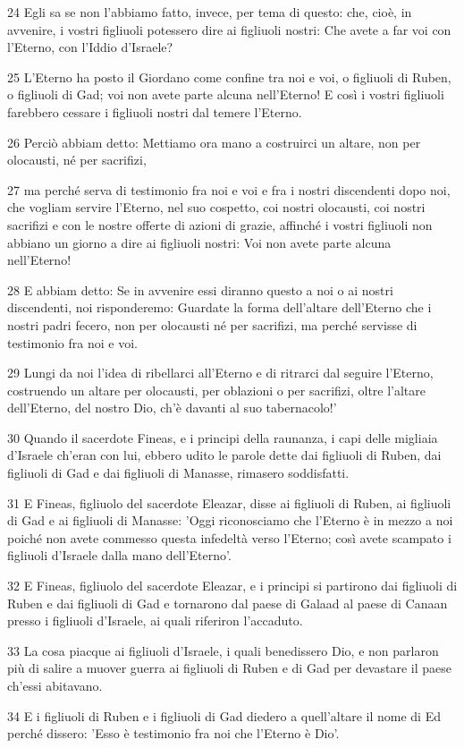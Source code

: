 \par 24 Egli sa se non l'abbiamo fatto, invece, per tema di questo: che, cioè, in avvenire, i vostri figliuoli potessero dire ai figliuoli nostri: Che avete a far voi con l'Eterno, con l'Iddio d'Israele?
\par 25 L'Eterno ha posto il Giordano come confine tra noi e voi, o figliuoli di Ruben, o figliuoli di Gad; voi non avete parte alcuna nell'Eterno! E così i vostri figliuoli farebbero cessare i figliuoli nostri dal temere l'Eterno.
\par 26 Perciò abbiam detto: Mettiamo ora mano a costruirci un altare, non per olocausti, né per sacrifizi,
\par 27 ma perché serva di testimonio fra noi e voi e fra i nostri discendenti dopo noi, che vogliam servire l'Eterno, nel suo cospetto, coi nostri olocausti, coi nostri sacrifizi e con le nostre offerte di azioni di grazie, affinché i vostri figliuoli non abbiano un giorno a dire ai figliuoli nostri: Voi non avete parte alcuna nell'Eterno!
\par 28 E abbiam detto: Se in avvenire essi diranno questo a noi o ai nostri discendenti, noi risponderemo: Guardate la forma dell'altare dell'Eterno che i nostri padri fecero, non per olocausti né per sacrifizi, ma perché servisse di testimonio fra noi e voi.
\par 29 Lungi da noi l'idea di ribellarci all'Eterno e di ritrarci dal seguire l'Eterno, costruendo un altare per olocausti, per oblazioni o per sacrifizi, oltre l'altare dell'Eterno, del nostro Dio, ch'è davanti al suo tabernacolo!'
\par 30 Quando il sacerdote Fineas, e i principi della raunanza, i capi delle migliaia d'Israele ch'eran con lui, ebbero udito le parole dette dai figliuoli di Ruben, dai figliuoli di Gad e dai figliuoli di Manasse, rimasero soddisfatti.
\par 31 E Fineas, figliuolo del sacerdote Eleazar, disse ai figliuoli di Ruben, ai figliuoli di Gad e ai figliuoli di Manasse: 'Oggi riconosciamo che l'Eterno è in mezzo a noi poiché non avete commesso questa infedeltà verso l'Eterno; così avete scampato i figliuoli d'Israele dalla mano dell'Eterno'.
\par 32 E Fineas, figliuolo del sacerdote Eleazar, e i principi si partirono dai figliuoli di Ruben e dai figliuoli di Gad e tornarono dal paese di Galaad al paese di Canaan presso i figliuoli d'Israele, ai quali riferiron l'accaduto.
\par 33 La cosa piacque ai figliuoli d'Israele, i quali benedissero Dio, e non parlaron più di salire a muover guerra ai figliuoli di Ruben e di Gad per devastare il paese ch'essi abitavano.
\par 34 E i figliuoli di Ruben e i figliuoli di Gad diedero a quell'altare il nome di Ed perché dissero: 'Esso è testimonio fra noi che l'Eterno è Dio'.

